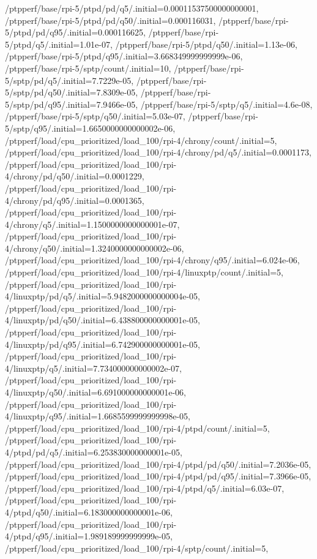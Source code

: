 {    /ptpperf/base/rpi-5/ptpd/pd/q5/.initial=0.00011537500000000001,
    /ptpperf/base/rpi-5/ptpd/pd/q50/.initial=0.000116031,
    /ptpperf/base/rpi-5/ptpd/pd/q95/.initial=0.000116625,
    /ptpperf/base/rpi-5/ptpd/q5/.initial=1.01e-07,
    /ptpperf/base/rpi-5/ptpd/q50/.initial=1.13e-06,
    /ptpperf/base/rpi-5/ptpd/q95/.initial=3.668349999999999e-06,
    /ptpperf/base/rpi-5/sptp/count/.initial=10,
    /ptpperf/base/rpi-5/sptp/pd/q5/.initial=7.7229e-05,
    /ptpperf/base/rpi-5/sptp/pd/q50/.initial=7.8309e-05,
    /ptpperf/base/rpi-5/sptp/pd/q95/.initial=7.9466e-05,
    /ptpperf/base/rpi-5/sptp/q5/.initial=4.6e-08,
    /ptpperf/base/rpi-5/sptp/q50/.initial=5.03e-07,
    /ptpperf/base/rpi-5/sptp/q95/.initial=1.6650000000000002e-06,
    /ptpperf/load/cpu_prioritized/load_100/rpi-4/chrony/count/.initial=5,
    /ptpperf/load/cpu_prioritized/load_100/rpi-4/chrony/pd/q5/.initial=0.0001173,
    /ptpperf/load/cpu_prioritized/load_100/rpi-4/chrony/pd/q50/.initial=0.0001229,
    /ptpperf/load/cpu_prioritized/load_100/rpi-4/chrony/pd/q95/.initial=0.0001365,
    /ptpperf/load/cpu_prioritized/load_100/rpi-4/chrony/q5/.initial=1.1500000000000001e-07,
    /ptpperf/load/cpu_prioritized/load_100/rpi-4/chrony/q50/.initial=1.3240000000000002e-06,
    /ptpperf/load/cpu_prioritized/load_100/rpi-4/chrony/q95/.initial=6.024e-06,
    /ptpperf/load/cpu_prioritized/load_100/rpi-4/linuxptp/count/.initial=5,
    /ptpperf/load/cpu_prioritized/load_100/rpi-4/linuxptp/pd/q5/.initial=5.9482000000000004e-05,
    /ptpperf/load/cpu_prioritized/load_100/rpi-4/linuxptp/pd/q50/.initial=6.438800000000001e-05,
    /ptpperf/load/cpu_prioritized/load_100/rpi-4/linuxptp/pd/q95/.initial=6.742900000000001e-05,
    /ptpperf/load/cpu_prioritized/load_100/rpi-4/linuxptp/q5/.initial=7.734000000000002e-07,
    /ptpperf/load/cpu_prioritized/load_100/rpi-4/linuxptp/q50/.initial=6.691000000000001e-06,
    /ptpperf/load/cpu_prioritized/load_100/rpi-4/linuxptp/q95/.initial=1.6685599999999998e-05,
    /ptpperf/load/cpu_prioritized/load_100/rpi-4/ptpd/count/.initial=5,
    /ptpperf/load/cpu_prioritized/load_100/rpi-4/ptpd/pd/q5/.initial=6.253830000000001e-05,
    /ptpperf/load/cpu_prioritized/load_100/rpi-4/ptpd/pd/q50/.initial=7.2036e-05,
    /ptpperf/load/cpu_prioritized/load_100/rpi-4/ptpd/pd/q95/.initial=7.3966e-05,
    /ptpperf/load/cpu_prioritized/load_100/rpi-4/ptpd/q5/.initial=6.03e-07,
    /ptpperf/load/cpu_prioritized/load_100/rpi-4/ptpd/q50/.initial=6.183000000000001e-06,
    /ptpperf/load/cpu_prioritized/load_100/rpi-4/ptpd/q95/.initial=1.989189999999999e-05,
    /ptpperf/load/cpu_prioritized/load_100/rpi-4/sptp/count/.initial=5,
}

